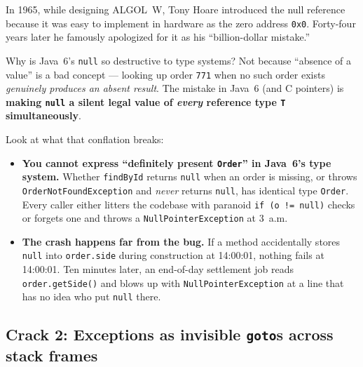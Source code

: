In 1965, while designing ALGOL~W, Tony Hoare introduced the null reference because it was easy to implement in hardware as the zero address \texttt{0x0}. Forty-four years later he famously apologized for it as his ``billion-dollar mistake.''

Why is Java~6's \texttt{null} so destructive to type systems? Not because ``absence of a value'' is a bad concept --- looking up order \texttt{771} when no such order exists \emph{genuinely produces an absent result}. The mistake in Java~6 (and C pointers) is \textbf{making \texttt{null} a silent legal value of \emph{every} reference type \texttt{T} simultaneously}.

Look at what that conflation breaks:
\begin{itemize}
  \item \textbf{You cannot express ``definitely present \texttt{Order}'' in Java~6's type system.} Whether \texttt{findById} returns \texttt{null} when an order is missing, or throws \texttt{OrderNotFound\allowbreak Exception} and \emph{never} returns \texttt{null}, has identical type \texttt{Order}. Every caller either litters the codebase with paranoid \texttt{if (o != null)} checks or forgets one and throws a \texttt{NullPointerException} at 3~a.m.
  \item \textbf{The crash happens far from the bug.} If a method accidentally stores \texttt{null} into \texttt{order.side} during construction at 14:00:01, nothing fails at 14:00:01. Ten minutes later, an end-of-day settlement job reads \texttt{order.getSide()} and blows up with \texttt{NullPointerException} at a line that has no idea who put \texttt{null} there.
\end{itemize}

\subsection{Crack 2: Exceptions as invisible \texttt{goto}s across stack frames}

